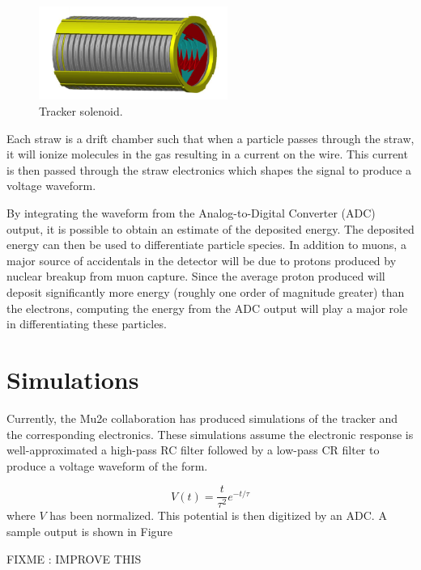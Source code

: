 \begin{figure}[htp!]
    \centering
    \includegraphics[width=0.55\textwidth]{Images/trackerSolenoid.png}
    \caption{Tracker solenoid.}
    \label{trackerSolenoid}
\end{figure} 

Each straw is a drift chamber such that when a particle passes through the straw, it will ionize molecules in the gas resulting in a current on the wire. This current is then passed through the straw electronics which shapes the signal to produce a voltage waveform.

By integrating the waveform from the Analog-to-Digital Converter (ADC) output, it is possible to obtain an estimate of the deposited energy. The deposited energy can then be used to differentiate particle species. In addition to muons, a major source of accidentals in the detector will be due to protons produced by nuclear breakup from muon capture. Since the average proton produced will deposit significantly more energy (roughly one order of magnitude greater) than the electrons, computing the energy from the ADC output will play a major role in differentiating these particles.

\section{Simulations}
Currently, the Mu2e collaboration has produced simulations of the tracker and the corresponding electronics. These  simulations assume the electronic response is well-approximated a high-pass RC filter followed by a low-pass CR filter to produce a voltage waveform of the form.

\begin{equation}
   V (t) = \frac{t}{\tau^2} e^{-t / \tau}
 \end{equation} 
where $V$ has been normalized. This potential is then digitized by an ADC. A sample output is shown in Figure %

FIXME : IMPROVE THIS

